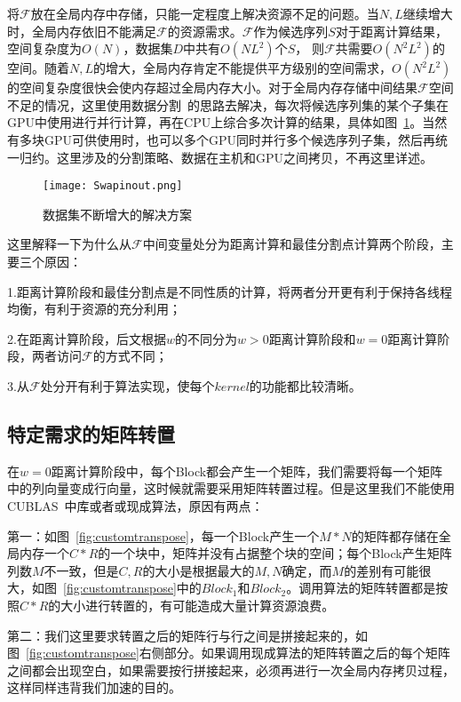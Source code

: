 将$\mathcal{F}$放在全局内存中存储，只能一定程度上解决资源不足的问题。当$N,L$继续增大时，全局内存依旧不能满足$\mathcal{F}$的资源需求。$\mathcal{F}$作为候选序列$S$对于距离计算结果，空间复杂度为$O(N)$，数据集$D$中共有$O(NL^2)$个$S$，
则$\mathcal{F}$共需要$O(N^2L^2)$的空间。随着$N,L$的增大，全局内存肯定不能提供平方级别的空间需求，$O(N^2L^2)$的空间复杂度很快会使内存超过全局内存大小。对于全局内存存储中间结果$\mathcal{F}$空间不足的情况，这里使用数据分割~\cite{li2016data}的思路去解决，每次将候选序列集的某个子集在GPU中使用进行并行计算，再在CPU上综合多次计算的结果，具体如图~\ref{fig:Swapinout}。当然有多块GPU可供使用时，也可以多个GPU同时并行多个候选序列子集，然后再统一归约。这里涉及的分割策略、数据在主机和GPU之间拷贝，不再这里详述。

\begin{figure}[H] %
	\centering
	\texttt{[image: Swapinout.png]}
	\caption{数据集不断增大的解决方案}
	\label{fig:Swapinout}
\end{figure}

这里解释一下为什么从$\mathcal{F}$中间变量处分为距离计算和最佳分割点计算两个阶段，主要三个原因：

1.距离计算阶段和最佳分割点是不同性质的计算，将两者分开更有利于保持各线程均衡，有利于资源的充分利用；

2.在距离计算阶段，后文根据$w$的不同分为$w>0$距离计算阶段和$w=0$距离计算阶段，两者访问$\mathcal{F}$的方式不同；

3.从$\mathcal{F}$处分开有利于算法实现，使每个$kernel$的功能都比较清晰。


\subsection{特定需求的矩阵转置}

在$w=0$距离计算阶段中，每个Block都会产生一个矩阵，我们需要将每一个矩阵中的列向量变成行向量，这时候就需要采用矩阵转置过程。但是这里我们不能使用CUBLAS~\cite{chrzeszczyk2013matrix}中库或者或现成算法，原因有两点：

第一：如图~\ref{fig:customtranspose}，每一个Block产生一个$M*N$的矩阵都存储在全局内存一个$C*R$的一个块中，矩阵并没有占据整个块的空间；每个Block产生矩阵列数$M$不一致，但是$C,R$的大小是根据最大的$M,N$确定，而$M$的差别有可能很大，如图~\ref{fig:customtranspose}中的$Block_1$和$Block_2$。调用算法的矩阵转置都是按照$C*R$的大小进行转置的，有可能造成大量计算资源浪费。

第二：我们这里要求转置之后的矩阵行与行之间是拼接起来的，如图~\ref{fig:customtranspose}右侧部分。如果调用现成算法的矩阵转置之后的每个矩阵之间都会出现空白，如果需要按行拼接起来，必须再进行一次全局内存拷贝过程，这样同样违背我们加速的目的。

